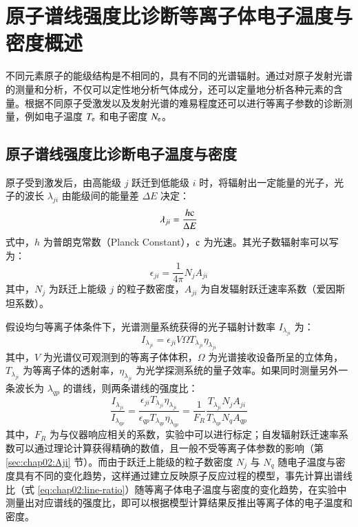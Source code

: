 ﻿\graphicspath{{figures/chap02/}}

\chapter{原子谱线强度比诊断等离子体电子温度与密度概述}
\label{chap:crm-intro}

不同元素原子的能级结构是不相同的，具有不同的光谱辐射。通过对原子发射光谱的测量和分析，不仅可以定性地分析气体成分，还可以定量地分析各种元素的含量。根据不同原子受激发以及发射光谱的难易程度还可以进行等离子参数的诊断测量，例如电子温度 $T_{\rm e}$ 和电子密度 $N_{\rm e}$。

\section{原子谱线强度比诊断电子温度与密度}

原子受到激发后，由高能级 $j$ 跃迁到低能级 $i$ 时，将辐射出一定能量的光子，光子的波长 $\lambda_{ji}$ 由能级间的能量差 $\Delta E$ 决定：
\begin{equation}
  \lambda_{ji} = \frac{h{\rm c}}{\Delta E}
\end{equation}
式中，$h$ 为普朗克常数（Planck Constant），${\rm c}$ 为光速。其光子数辐射率可以写为\cite{Wiese1966:book}：
\begin{equation}
  \epsilon_{ji}=\frac{1}{4\pi}N_{j}A_{ji}
\end{equation}
其中，$N_j$ 为跃迁上能级 $j$ 的粒子数密度，$A_{ji}$ 为自发辐射跃迁速率系数（爱因斯坦系数）。

假设均匀等离子体条件下，光谱测量系统获得的光子辐射计数率 $I_{\lambda_{ji}}$ 为：
\begin{equation}
  I_{\lambda_{ji}}=\epsilon_{ji}V\Omega T_{\lambda_{ji}}\eta_{\lambda_{ji}}
\end{equation}
其中，$V$ 为光谱仪可观测到的等离子体体积，$\Omega$ 为光谱接收设备所呈的立体角，$T_{\lambda_{ji}}$ 为等离子体的透射率，$\eta_{\lambda_{ji}}$ 为光学探测系统的量子效率。如果同时测量另外一条波长为 $\lambda_{qp}$ 的谱线，则两条谱线的强度比：
\begin{equation}
\label{eq:chap02:line-ratio}
  \frac{I_{\lambda_{ji}}}{I_{\lambda_{qp}}}=
  \frac{\epsilon_{ji}T_{\lambda_{ji}}\eta_{\lambda_{ji}}}{\epsilon_{qp}T_{\lambda_{qp}}\eta_{\lambda_{qp}}}
  =\frac{1}{F_R}\frac{T_{\lambda_{ji}}N_jA_{ji}}{T_{\lambda_{qp}}N_qA_{qp}}
\end{equation}
其中，$F_R$ 为与仪器响应相关的系数，实验中可以进行标定；自发辐射跃迁速率系数可以通过理论计算获得精确的数值，且一般不受等离子体参数的影响（第 \ref{sec:chap02:Aji} 节）。而由于跃迁上能级的粒子数密度 $N_{j}$ 与 $N_{q}$ 随电子温度与密度具有不同的变化趋势，这样通过建立反映原子反应过程的模型，事先计算出谱线比（式 \ref{eq:chap02:line-ratio}）随等离子体电子温度与密度的变化趋势，在实验中测量出对应谱线的强度比，即可以根据模型计算结果反推出等离子体的电子温度和密度。

